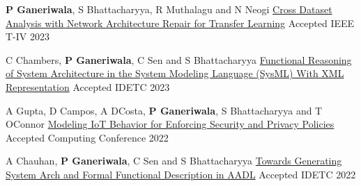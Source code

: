 \begin{cventries}
{\begin{cvitems}
\end{cvitems}
}
\cventry
{\textbf{P Ganeriwala}, S Bhattacharyya, R Muthalagu and N Neogi}
{\href{https://ieeexplore.ieee.org/abstract/document/10186721}{Cross Dataset Analysis with Network Architecture Repair for Transfer Learning}}
{Accepted}
{IEEE T-IV 2023} 
{ %
\begin{cvitems}
\end{cvitems}
}
\cventry
{C Chambers, \textbf{P Ganeriwala}, C Sen and S Bhattacharyya}
{\href{https://asmedigitalcollection.asme.org/IDETC-CIE/proceedings-abstract/IDETC-CIE2023/87295/1170388}{Functional Reasoning of System Architecture in the System Modeling Language (SysML) With XML Representation}}
{Accepted}
{IDETC 2023} 
{ %
\begin{cvitems}
\end{cvitems}
}
\cventry
{A Gupta, D Campos, A DCosta, \textbf{P Ganeriwala}, S Bhattacharyya and T OConnor}
{\href{https://link.springer.com/chapter/10.1007/978-3-031-37717-4_95}{Modeling IoT Behavior for Enforcing Security and Privacy Policies}}
{Accepted}
{Computing Conference 2022} 
{ %
\begin{cvitems}
\end{cvitems}
}
\cventry
{A Chauhan, \textbf{P Ganeriwala}, C Sen and S Bhattacharyya}
{\href{https://asmedigitalcollection.asme.org/IDETC-CIE/proceedings-abstract/IDETC-CIE2022/86212/1150294}{Towards Generating System Arch and Formal Functional Description in AADL}}
{Accepted}
{IDETC 2022} 
{ %
\begin{cvitems}

\end{cvitems}}
\end{cventries}
